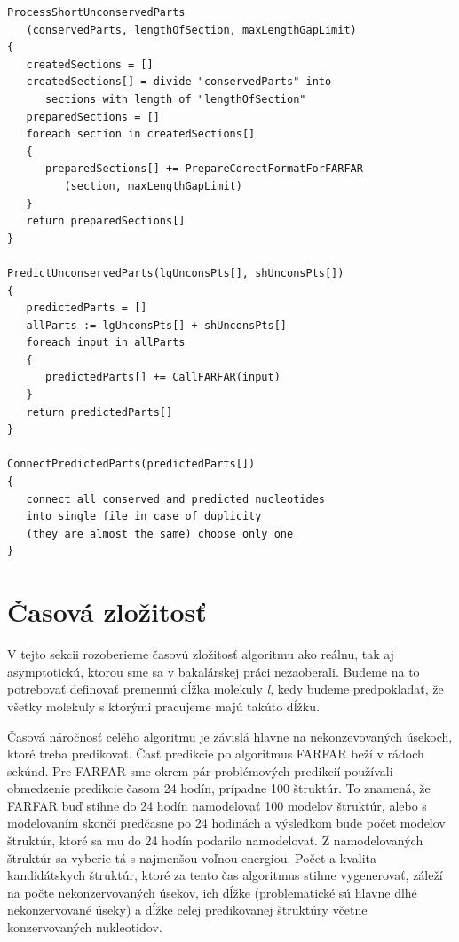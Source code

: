 \begin{lstlisting}
ProcessShortUnconservedParts
   (conservedParts, lengthOfSection, maxLengthGapLimit)
{
   createdSections = []
   createdSections[] = divide "conservedParts" into 
      sections with length of "lengthOfSection"
   preparedSections = []
   foreach section in createdSections[]
   {
      preparedSections[] += PrepareCorectFormatForFARFAR
         (section, maxLengthGapLimit)
   }
   return preparedSections[]
}

PredictUnconservedParts(lgUnconsPts[], shUnconsPts[])
{
   predictedParts = []
   allParts := lgUnconsPts[] + shUnconsPts[]
   foreach input in allParts
   {
      predictedParts[] += CallFARFAR(input)
   }
   return predictedParts[]	
}

ConnectPredictedParts(predictedParts[])
{
   connect all conserved and predicted nucleotides 
   into single file in case of duplicity
   (they are almost the same) choose only one 
}
\end{lstlisting}


\section{Časová zložitosť}
V tejto sekcii rozoberieme časovú zložitosť algoritmu ako reálnu, tak aj asymptotickú, ktorou sme sa v bakalárskej práci nezaoberali. Budeme na to potrebovať definovať premennú dĺžka molekuly \textit{l}, kedy budeme predpokladať, že všetky molekuly s ktorými pracujeme majú takúto dĺžku. 


\indent Časová náročnosť celého algoritmu je závislá hlavne na nekonzevovaných úsekoch, ktoré treba predikovať. Časť predikcie po algoritmus FARFAR beží v rádoch sekúnd. Pre FARFAR sme okrem pár problémových predikcií používali obmedzenie predikcie časom 24 hodín, prípadne 100 štruktúr. To znamená, že FARFAR buď stihne do 24 hodín namodelovať 100 modelov štruktúr, alebo s modelovaním skončí predčasne po 24 hodinách a výsledkom bude počet modelov štruktúr, ktoré sa mu do 24 hodín podarilo namodelovať. Z namodelovaných štruktúr sa vyberie tá s najmenšou voľnou energiou. Počet a kvalita kandidátskych štruktúr, ktoré za tento čas algoritmus stihne vygenerovať, záleží na počte nekonzervovaných úsekov, ich dĺžke (problematické sú hlavne dlhé nekonzervované úseky) a dĺžke celej predikovanej štruktúry včetne konzervovaných nukleotidov. 

